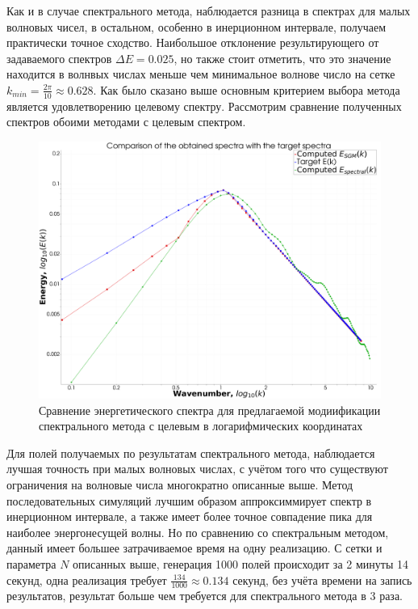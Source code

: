 Как и в случае спектрального метода, наблюдается разница в спектрах для малых волновых чисел, в остальном, особенно в инерционном интервале, получаем практически точное сходство. Наибольшое отклонение результирующего от задаваемого спектров $\Delta E = 0.025$, но также стоит отметить, что это значение находится в волнвых числах меньше чем минимальное волнове число на сетке $k_{min}=\frac{2 \pi}{10} \approx 0.628$. Как было сказано выше основным критерием выбора метода является удовлетворению целевому спектру. Рассмотрим сравнение полученных спектров обоими методами с целевым спектром.

\begin{figure}[ht] 
    \center
    \includegraphics [width=0.8\linewidth] {images/comparison_of_result_spectras.png}
    \caption{Сравнение энергетического спектра для предлагаемой модиификации спектрального метода с целевым в логарифмических координатах} 
    \label{img:main_comparison_of_target_spectras}  
\end{figure}

Для полей получаемых по результатам спектрального метода, наблюдается лучшая точность при малых волновых числах, с учётом того что существуют ограничения на волновые числа многократно описанные выше. Метод последовательных симуляций лучшим образом аппроксиммирует спектр в инерционном интервале, а также имеет более точное совпадение пика для наиболее энергонесущей волны. Но по сравнению со спектральным методом, данный имеет большее затрачиваемое время на одну реализацию. С сетки и параметра $N$ описанных выше, генерация 1000 полей происходит за 2 минуты 14 секунд, одна реализация требует $\frac{134}{1000} \approx 0.134$ секунд, без учёта времени на запись результатов, результат больше чем требуется для спектрального метода в 3 раза.